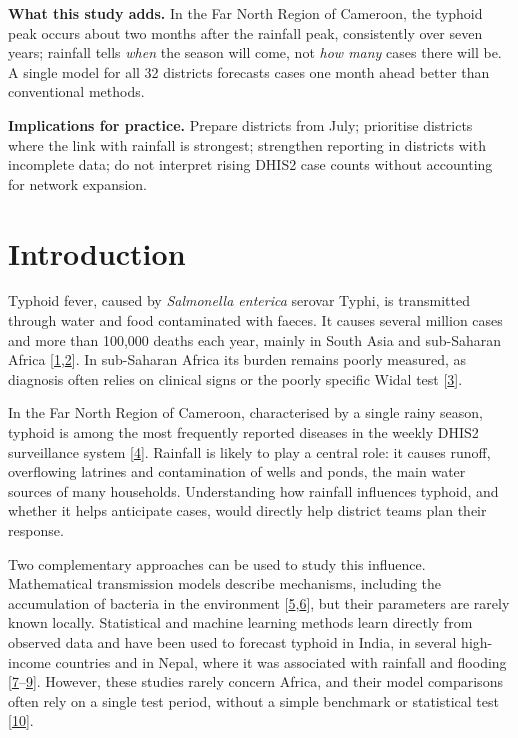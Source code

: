 \documentclass[11pt]{article}
\begin{document}
\textbf{What this study adds.} In the Far North Region of Cameroon, the typhoid peak occurs about two months after the rainfall peak, consistently over seven years; rainfall tells \textit{when} the season will come, not \textit{how many} cases there will be. A single model for all 32 districts forecasts cases one month ahead better than conventional methods.


\textbf{Implications for practice.} Prepare districts from July; prioritise districts where the link with rainfall is strongest; strengthen reporting in districts with incomplete data; do not interpret rising DHIS2 case counts without accounting for network expansion.

\section{Introduction}
Typhoid fever, caused by \textit{Salmonella enterica} serovar Typhi, is transmitted through water and food contaminated with faeces. It causes several million cases and more than 100,000 deaths each year, mainly in South Asia and sub-Saharan Africa [\hyperlink{ref1}{1},\hyperlink{ref2}{2}]. In sub-Saharan Africa its burden remains poorly measured, as diagnosis often relies on clinical signs or the poorly specific Widal test [\hyperlink{ref3}{3}].

In the Far North Region of Cameroon, characterised by a single rainy season, typhoid is among the most frequently reported diseases in the weekly DHIS2 surveillance system [\hyperlink{ref4}{4}]. Rainfall is likely to play a central role: it causes runoff, overflowing latrines and contamination of wells and ponds, the main water sources of many households. Understanding how rainfall influences typhoid, and whether it helps anticipate cases, would directly help district teams plan their response.

Two complementary approaches can be used to study this influence. Mathematical transmission models describe mechanisms, including the accumulation of bacteria in the environment [\hyperlink{ref5}{5},\hyperlink{ref6}{6}], but their parameters are rarely known locally. Statistical and machine learning methods learn directly from observed data and have been used to forecast typhoid in India, in several high-income countries and in Nepal, where it was associated with rainfall and flooding [\hyperlink{ref7}{7}--\hyperlink{ref9}{9}]. However, these studies rarely concern Africa, and their model comparisons often rely on a single test period, without a simple benchmark or statistical test [\hyperlink{ref10}{10}].
\end{document}
